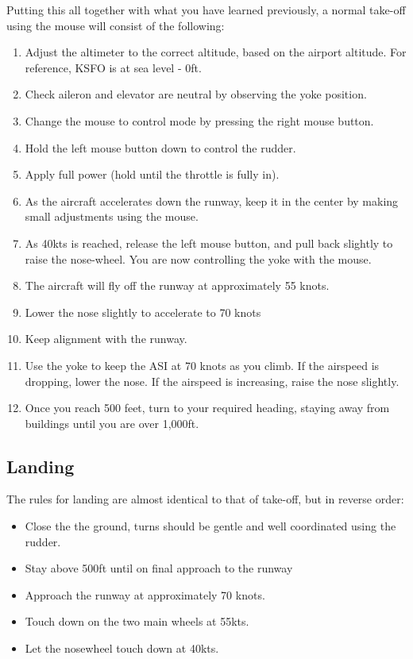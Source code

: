 Putting this all together with what you have learned previously, a normal
take-off using the mouse will consist of the following:

\begin{enumerate}
  \item Adjust the altimeter to the correct altitude, based on the airport
  altitude. For reference, KSFO is at sea level - 0ft.
	\item Check aileron and elevator are neutral by observing the yoke position.
  \item Change the mouse to control mode by pressing the right mouse button.
  \item Hold the left mouse button down to control the rudder.
  \item Apply full power (hold  until the throttle is fully in).
  \item As the aircraft accelerates down the runway, keep it in the center by
  making small adjustments using the mouse.
  \item As 40kts is reached, release the left mouse button, and pull back 
  slightly to raise the nose-wheel. You are now controlling the yoke with the
  mouse.
  \item The aircraft will fly off the runway at approximately 55 knots.
  \item Lower the nose slightly to accelerate to 70 knots
  \item Keep alignment with the runway.
  \item Use the yoke to keep the ASI at 70 knots as you climb. If the airspeed
  is dropping, lower the nose. If the airspeed is increasing, raise the nose
  slightly.
  \item Once you reach 500 feet, turn to your required heading, staying away from
  buildings until you are over 1,000ft.
\end{enumerate}

\subsection{Landing}
\label{sec:Ladowanie}
  
The rules for landing are almost identical to that of take-off, but in reverse
order:
\begin{itemize}
	\item Close the the ground, turns should be gentle and well coordinated
  using the rudder. 
  \item Stay above 500ft until on final approach to the runway
	\item Approach the runway at approximately 70 knots. 
	\item Touch down on the two main wheels at 55kts.
  \item Let the nosewheel touch down at 40kts.
\end{itemize}

